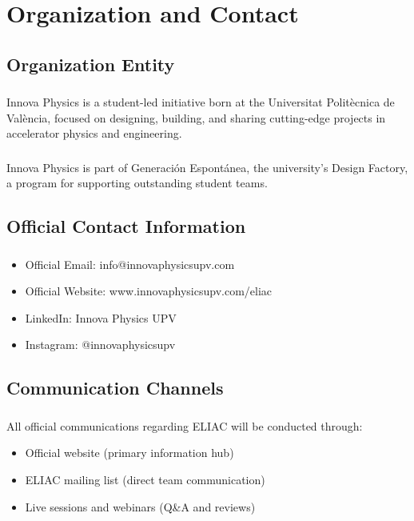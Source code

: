 
\renewcommand{\thesection}{OC}
\section{Organization and Contact}

\subsection{Organization Entity}

\subsubsection{}
Innova Physics is a student-led initiative born at the Universitat Politècnica de València, focused on designing, building, and sharing cutting-edge projects in accelerator physics and engineering.

\subsubsection{}
Innova Physics is part of Generación Espontánea, the university's Design Factory, a program for supporting outstanding student teams.

\subsection{Official Contact Information}

\subsubsection{}
\begin{itemize}[noitemsep]
    \item Official Email: info@innovaphysicsupv.com
    \item Official Website: www.innovaphysicsupv.com/eliac
    \item LinkedIn: Innova Physics UPV
    \item Instagram: @innovaphysicsupv
\end{itemize}

\subsection{Communication Channels}

\subsubsection{}
All official communications regarding ELIAC will be conducted through:
\begin{itemize}[noitemsep]
    \item Official website (primary information hub)
    \item ELIAC mailing list (direct team communication)
    \item Live sessions and webinars (Q\&A and reviews)
\end{itemize}

